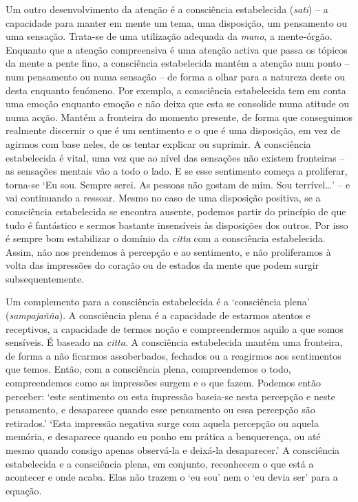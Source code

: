 Um outro desenvolvimento da atenção é a consciência estabelecida (\emph{sati})
-- a capacidade para manter em mente um tema, uma disposição, um pensamento ou
uma sensação. Trata-se de uma utilização adequada da \emph{mano}, a mente-órgão.
Enquanto que a atenção compreensiva é uma atenção activa que passa os tópicos da
mente a pente fino, a consciência estabelecida mantém a atenção num ponto -- num
pensamento ou numa sensação -- de forma a olhar para a natureza deste ou desta
enquanto fenómeno. Por exemplo, a consciência estabelecida tem em conta uma
emoção enquanto emoção e não deixa que esta se consolide numa atitude ou numa
acção. Mantém a fronteira do momento presente, de forma que conseguimos
realmente discernir o que é um sentimento e o que é uma disposição, em vez de
agirmos com base neles, de os tentar explicar ou suprimir. A consciência
estabelecida é vital, uma vez que ao nível das sensações não existem fronteiras
-- as sensações mentais vão a todo o lado. E se esse sentimento começa a
proliferar, torna-se `Eu sou. Sempre serei. As pessoas não gostam de mim. Sou
terrível\ldots' -- e vai continuando a ressoar. Mesmo no caso de uma disposição
positiva, se a consciência estabelecida se encontra ausente, podemos partir do
princípio de que tudo é fantástico e sermos bastante insensíveis às disposições
dos outros. Por isso é sempre bom estabilizar o domínio da \emph{citta} com a
consciência estabelecida. Assim, não nos prendemos à percepção e ao sentimento,
e não proliferamos à volta das impressões do coração ou de estados da mente que
podem surgir subsequentemente.

Um complemento para a consciência estabelecida é a `consciência plena'
(\emph{sampajañña}). A consciência plena é a capacidade de estarmos atentos e
receptivos, a capacidade de termos noção e compreendermos aquilo a que somos
sensíveis. É baseado na \emph{citta}. A consciência estabelecida mantém uma
fronteira, de forma a não ficarmos assoberbados, fechados ou a reagirmos aos
sentimentos que temos. Então, com a consciência plena, compreendemos o todo,
compreendemos como as impressões surgem e o que fazem. Podemos então perceber:
`este sentimento ou esta impressão baseia-se nesta percepção e neste pensamento,
e desaparece quando esse pensamento ou essa percepção são retirados.' `Esta
impressão negativa surge com aquela percepção ou aquela memória, e desaparece
quando eu ponho em prática a benquerença, ou até mesmo quando consigo apenas
observá-la e deixá-la desaparecer.' A consciência estabelecida e a consciência
plena, em conjunto, reconhecem o que está a acontecer e onde acaba. Elas não
trazem o `eu sou' nem o `eu devia ser' para a equação.

